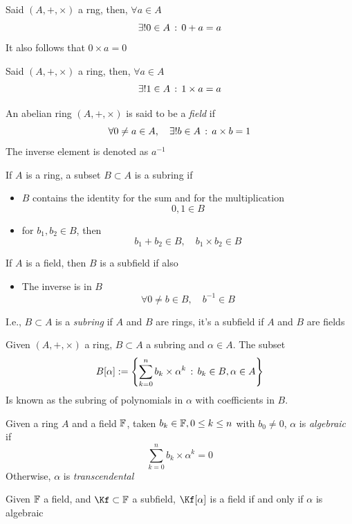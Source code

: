 \documentclass[../complete.tex]{subfiles}
\begin{document}
\begin{thm}
	Said $(A, +, \times)$ a rng, then, $\forall a\in A$
	$$\exists!0\in A\, :\,  0+a=a$$
	It also follows that $0\times a=0$
\end{thm}
\begin{thm}
	Said $(A, +, \times)$ a ring, then, $\forall a\in A$
	$$\exists!1\in A\, :\,  1\times a=a$$
\end{thm}
\begin{dfn}[Field]
	An abelian ring $(A, +, \times)$ is said to be a \textit{field} if 
	$$\forall 0\ne a\in A, \quad\exists! b\in A\, :\,  a\times b=1$$
	The inverse element is denoted as $a^{-1}$
\end{dfn}
\begin{dfn}
	If $A$ is a ring, a subset $B\subset A$ is a subring if
	\begin{itemize}
	\item $B$ contains the identity for the sum and for the multiplication
		$$0, 1\in B$$
	\item for $b_1, b_2\in B$, then
		$$b_1+b_2\in B, \quad b_1\times b_2\in B$$
	\end{itemize}
	If $A$ is a field, then $B$ is a subfield if also
	\begin{itemize}
	\item The inverse is in $B$ $$\forall 0\ne b\in B, \quad b^{-1}\in B$$
	\end{itemize}
	I.e., $B\subset A$ is a \textit{subring} if $A$ and $B$ are rings, it's a subfield if $A$ and $B$ are fields
\end{dfn}
\begin{dfn}
	Given $(A, +, \times)$ a ring, $B\subset A$ a subring and $\alpha\in A$. The subset
	$$B[\alpha]:=\left\{ \sum_{k=0}^{n}b_k\times\alpha^k\, :\,  b_k\in B, \alpha\in A \right\}$$
	Is known as the subring of polynomials in $\alpha$ with coefficients in $B$.\\
\end{dfn}
\begin{dfn}
	Given a ring $A$ and a field $\mathbb{F}$, taken $b_k\in\mathbb{F}, 0\le k\le n$ with $b_0\ne 0$, $\alpha$ is \textit{algebraic} if
	$$\sum_{k=0}^{n}b_k\times\alpha^k=0$$
	Otherwise, $\alpha$ is \textit{transcendental}
\end{dfn}
\begin{thm}
	Given $\mathbb{F}$ a field, and $\Kf\subset\F$ a subfield, $\Kf[\alpha]$ is a field if and only if $\alpha$ is algebraic
\end{thm}
\end{document}
